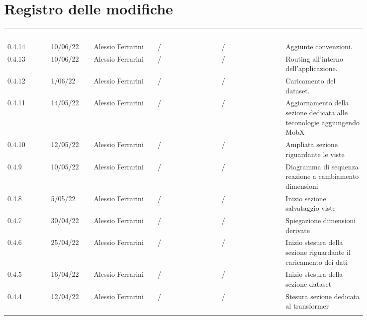\section*{Registro delle modifiche}

{\renewcommand{\arraystretch}{1.5}
\scriptsize
\begin{tabular}{p{0.10\linewidth}p{0.10\linewidth}p{0.15\linewidth}p{0.15\linewidth}p{0.15\linewidth}p{0.19\linewidth}}
	\rowcolor[RGB]{33, 73, 50}
	\textcolor{white}{\textbf{Versione}} & \textcolor{white}{\textbf{Data}} &
	\textcolor{white}{\textbf{Redattore}} & \textcolor{white}{\textbf{Verificatore}} &
	\textcolor{white}{\textbf{Approvatore}} & \textcolor{white}{\textbf{Descrizione}}\\
	\rowcolor[RGB]{233, 245, 206}
	0.4.14 & 10/06/22 & Alessio Ferrarini & / & / & Aggiunte convenzioni.\\
	\rowcolor[RGB]{216, 235, 171}
	0.4.13 & 10/06/22 & Alessio Ferrarini & / & / & Routing all'interno dell'applicazione. \\
	\rowcolor[RGB]{233, 245, 206}
	0.4.12 & 1/06/22 & Alessio Ferrarini & / & / & Caricamento del dataset.\\
	\rowcolor[RGB]{216, 235, 171}
	0.4.11 & 14/05/22 & Alessio Ferrarini & / & / & Aggiornamento della sezione
  dedicata alle teconologie aggiungendo MobX \\
	\rowcolor[RGB]{233, 245, 206}
	0.4.10 & 12/05/22 & Alessio Ferrarini & / & / & Ampliata sezione riguardante le
  viste \\
	\rowcolor[RGB]{216, 235, 171}
	0.4.9 & 10/05/22 & Alessio Ferrarini & / & / & Diagramma di sequenza reazione
  a cambiamento dimensioni \\
	\rowcolor[RGB]{233, 245, 206}
	0.4.8 & 5/05/22 & Alessio Ferrarini & / & / & Inizio sezione salvataggio
  viste \\
	\rowcolor[RGB]{216, 235, 171}
	0.4.7 & 30/04/22 & Alessio Ferrarini & / & / & Spiegazione dimensioni derivate
  \\
	\rowcolor[RGB]{233, 245, 206}
	0.4.6 & 25/04/22 & Alessio Ferrarini & / & / & Inizio stesura della sezione
  riguardante il caricamento dei dati \\
	\rowcolor[RGB]{216, 235, 171}
	0.4.5 & 16/04/22 & Alessio Ferrarini & / & / & Inizio stesura della sezione
  dataset \\
	\rowcolor[RGB]{233, 245, 206}
	0.4.4 & 12/04/22 & Alessio Ferrarini & / & / & Stesura sezione dedicata al
  transformer \\
	\rowcolor[RGB]{216, 235, 171}

\end{tabular}}
